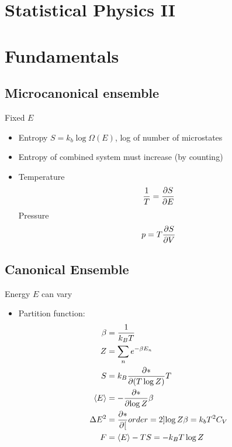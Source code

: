 


\section*{Statistical Physics \hfill II}

\section{Fundamentals}
\subsection*{Microcanonical ensemble}
Fixed $E$
\begin{itemize}
\item Entropy $S= k_b \log \Omega(E)$, log of number of microstates
\item Entropy of combined system must increase (by counting)
\item Temperature \[\frac{1}{T}=\frac{\partial{S}}{\partial{E}}\]
Pressure \[p = T\frac{\partial{S}}{\partial{V}}\] 
\end{itemize}

\subsection*{Canonical Ensemble}
Energy $E$ can vary
\begin{itemize}
    \item Partition function:
\begin{align*}
    \beta &= \frac{1}{k_BT} \\
    Z &= \sum_n e^{-\beta E_n} \\
    S &= k_B \frac{\partial{*}}{\partial{(T \log Z)}}{T} \\
    \left\langle E\right\rangle &= -\frac{\partial{*}}{\partial{\log Z}}{\beta}\\
    \Delta E^2 &= \frac{\partial{*}}{\partial{[}}order=2]{\log Z}{\beta} = k_b T^2 C_V\\
    F &= \left\langle E\right\rangle -TS =-k_BT\log Z \\
\end{align*}
\end{itemize}

